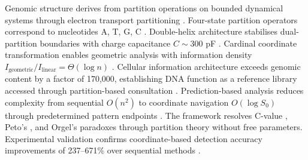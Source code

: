 \documentclass[11pt,a4paper]{article}
\theoremstyle{remark}
\begin{document}
Genomic structure derives from partition operations on bounded dynamical systems through electron transport partitioning \citep{poincare1890probleme, mitchell1961coupling, nicholls2013bioenergetics}. Four-state partition operators correspond to nucleotides A, T, G, C \citep{watson1953molecular}. Double-helix architecture stabilises dual-partition boundaries with charge capacitance $C \sim 300$ pF \citep{bloomfield1997dna, kornyshev2007physics}. Cardinal coordinate transformation enables geometric analysis with information density $I_{\text{geometric}}/I_{\text{linear}} = \Theta(\log n)$ \citep{shannon1948mathematical, nandy2006graphical}. Cellular information architecture exceeds genomic content by a factor of 170,000, establishing DNA function as a reference library accessed through partition-based consultation \citep{elowitz2002stochastic, larsson2019genomic}. Prediction-based analysis reduces complexity from sequential $O(n^2)$ to coordinate navigation $O(\log S_0)$ through predetermined pattern endpoints \citep{landauer1961irreversibility, altschul1990basic}. The framework resolves C-value \citep{gregory2001coincidence}, Peto's \citep{peto1977naturally}, and Orgel's \citep{orgel1968evolution} paradoxes through partition theory without free parameters. Experimental validation confirms coordinate-based detection accuracy improvements of 237–671\% over sequential methods \citep{benson1999tandem, stormo2000dna}.



\end{document}
